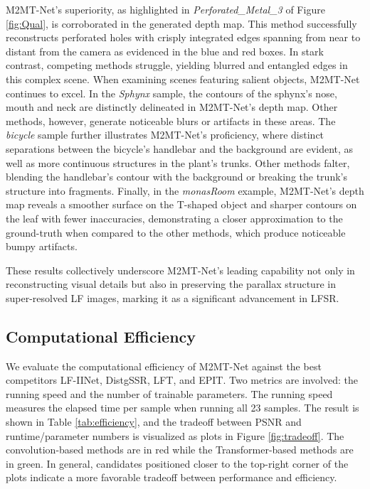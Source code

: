 M2MT-Net's superiority, as highlighted in \textit{Perforated\_Metal\_3} of Figure \ref{fig:Qual}, is corroborated in the generated depth map. This method successfully reconstructs perforated holes with crisply integrated edges spanning from near to distant from the camera as evidenced in the blue and red boxes. In stark contrast, competing methods struggle, yielding blurred and entangled edges in this complex scene. When examining scenes featuring salient objects, M2MT-Net continues to excel. In the \textit{Sphynx} sample, the contours of the sphynx's nose, mouth and neck are distinctly delineated in M2MT-Net's depth map. Other methods, however, generate noticeable blurs or artifacts in these areas. The \textit{bicycle} sample further illustrates M2MT-Net's proficiency, where distinct separations between the bicycle's handlebar and the background are evident, as well as more continuous structures in the plant's trunks. Other methods falter, blending the handlebar's contour with the background or breaking the trunk's structure into fragments. Finally, in the \textit{monasRoom} example, M2MT-Net's depth map reveals a smoother surface on the T-shaped object and sharper contours on the leaf with fewer inaccuracies, demonstrating a closer approximation to the ground-truth when compared to the other methods, which produce noticeable bumpy artifacts.

These results collectively underscore M2MT-Net's leading capability not only in reconstructing visual details but also in preserving the parallax structure in super-resolved LF images, marking it as a significant advancement in LFSR.





\subsection{Computational Efficiency}
We evaluate the computational efficiency of M2MT-Net against the best competitors LF-IINet, DistgSSR, LFT, and EPIT. Two metrics are involved: the running speed and the number of trainable parameters. The running speed measures the elapsed time per sample when running all 23 samples. The result is shown in Table \ref{tab:efficiency}, and the tradeoff between PSNR and runtime/parameter numbers is visualized as plots in Figure \ref{fig:tradeoff}. The convolution-based methods are in red while the Transformer-based methods are in green. In general, candidates positioned closer to the top-right corner of the plots indicate a more favorable tradeoff between performance and efficiency.

